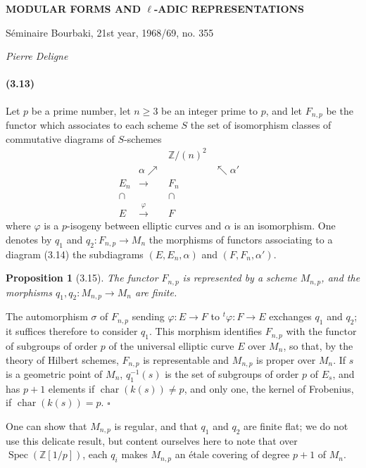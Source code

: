 \documentclass[10pt]{article}
\newcommand{\Z}{\mathbb Z}
\newcommand{\Spec}{\operatorname{Spec}}
\newcommand{\charop}{\operatorname{char}}
\newcommand{\QED}{\hfill$\square$}
\newtheorem*{proposition}{Proposition}
\begin{document}
\begin{center}
{\Large\bfseries MODULAR FORMS AND $\ell$-ADIC REPRESENTATIONS}\par
\vspace{0.35em}
{\large Séminaire Bourbaki, 21st year, 1968/69, no. 355}\par
\vspace{0.7em}
{\itshape Pierre Deligne}
\end{center}


\paragraph{(3.13)}
Let $p$ be a prime number, let $n\geq 3$ be an integer prime to $p$, and let $F_{n,p}$ be the functor which associates to each scheme $S$ the set of isomorphism classes of commutative diagrams of $S$-schemes
\[
\begin{array}{ccccc}
&& \Z/(n)^2 &&\\[-0.2em]
& \alpha\nearrow && \nwarrow\alpha' &\\[-0.2em]
E_n & \longrightarrow & F_n &&\\[-0.2em]
\cap && \cap &&\\[-0.2em]
E & \xrightarrow{\ \varphi\ } & F &&
\end{array}
\tag{3.14}
\]
where $\varphi$ is a $p$-isogeny between elliptic curves and $\alpha$ is an isomorphism. One denotes by $q_1$ and $q_2:F_{n,p}\to M_n$ the morphisms of functors associating to a diagram (3.14) the subdiagrams $(E,E_n,\alpha)$ and $(F,F_n,\alpha')$.

\begin{proposition}[3.15]
The functor $F_{n,p}$ is represented by a scheme $M_{n,p}$, and the morphisms $q_1,q_2:M_{n,p}\to M_n$ are finite.
\end{proposition}

The automorphism $\sigma$ of $F_{n,p}$ sending $\varphi:E\to F$ to ${}^{t}\!\varphi:F\to E$ exchanges $q_1$ and $q_2$; it suffices therefore to consider $q_1$. This morphism identifies $F_{n,p}$ with the functor of subgroups of order $p$ of the universal elliptic curve $E$ over $M_n$, so that, by the theory of Hilbert schemes, $F_{n,p}$ is representable and $M_{n,p}$ is proper over $M_n$. If $s$ is a geometric point of $M_n$, $q_1^{-1}(s)$ is the set of subgroups of order $p$ of $E_s$, and has $p+1$ elements if $\charop(k(s))\ne p$, and only one, the kernel of Frobenius, if $\charop(k(s))=p$. \QED

One can show that $M_{n,p}$ is regular, and that $q_1$ and $q_2$ are finite flat; we do not use this delicate result, but content ourselves here to note that over $\Spec(\Z[1/p])$, each $q_i$ makes $M_{n,p}$ an étale covering of degree $p+1$ of $M_n$.
\end{document}
